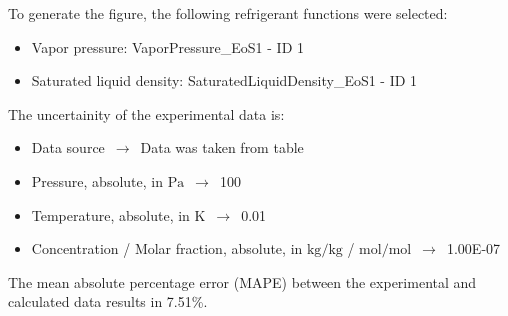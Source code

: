 To generate the figure, the following refrigerant functions were selected:
\begin{itemize}
\item Vapor pressure: VaporPressure\_EoS1 - ID 1
\item Saturated liquid density: SaturatedLiquidDensity\_EoS1 - ID 1
\end{itemize}

The uncertainity of the experimental data is:
\begin{itemize}
\item Data source $\,\to\,$ Data was taken from table
\item Pressure, absolute, in $\si{\pascal}$ $\,\to\,$ 100
\item Temperature, absolute, in $\si{\kelvin}$ $\,\to\,$ 0.01
\item Concentration / Molar fraction, absolute, in $\si{\kilogram\per\kilogram}$ / $\si{\mole\per\mole}$ $\,\to\,$ 1.00E-07
\end{itemize}

The mean absolute percentage error (MAPE) between the experimental and calculated data results in 7.51\%.
\FloatBarrier
\newpage

